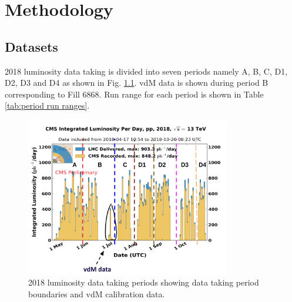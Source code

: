 \chapter{Methodology}  %

\ifpdf
    \graphicspath{{Chapter4/Figs/Raster/}{Chapter4/Figs/PDF/}{Chapter4/Figs/}}
\else
    \graphicspath{{Chapter4/Figs/Vector/}{Chapter4/Figs/}}
\fi


\section{Datasets}

2018 luminosity data taking is divided into seven periods namely A, B, C, D1, D2, D3 and D4 as shown in Fig. \ref{fig:period_bound}. vdM data is shown during period B corresponding to Fill 6868. Run range for each period is shown in Table \ref{tab:period run ranges}. 

\begin{figure}[!htp]
\centering
\includegraphics[width=0.8\textwidth]{ashish_thesis/period_boundary.png}
\caption{%
   2018 luminosity data taking periods showing data taking period boundaries and vdM calibration data.
}
\label{fig:period_bound}
\end{figure}


